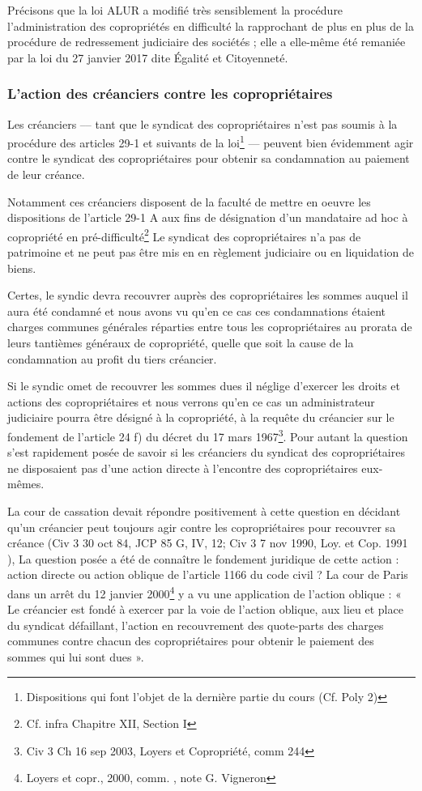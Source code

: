			Précisons que la loi ALUR a modifié très sensiblement la procédure l’administration des copropriétés en difficulté la rapprochant de plus en plus de la procédure de redressement judiciaire des sociétés ; elle a elle-même été remaniée par la loi du 27 janvier 2017 dite Égalité et Citoyenneté.
			
		\subsubsection{L’action des créanciers contre les copropriétaires}
		
			Les créanciers –-- tant que le syndicat des copropriétaires n’est pas soumis à la procédure des articles 29-1 et suivants de la loi\footnote{Dispositions qui font l’objet de la dernière partie du cours (Cf. Poly 2)} --- peuvent bien évidemment agir contre le syndicat des copropriétaires pour obtenir sa condamnation au paiement de leur créance.
			
			Notamment ces créanciers disposent de la faculté de mettre en oeuvre les dispositions de l’article 29-1 A aux fins de désignation d’un mandataire ad hoc à copropriété en pré-difficulté\footnote{Cf. infra Chapitre XII, Section I}
			Le syndicat des copropriétaires n’a pas de patrimoine et ne peut pas être mis en en règlement judiciaire ou en liquidation de biens.
			
			Certes, le syndic devra recouvrer auprès des copropriétaires les sommes auquel il aura été condamné et nous avons vu qu’en ce cas ces condamnations étaient charges communes générales réparties entre tous les copropriétaires au prorata de leurs tantièmes généraux de copropriété, quelle que soit la cause de la condamnation au profit du tiers créancier.
			
			Si le syndic omet de recouvrer les sommes dues il néglige d’exercer les droits et actions des copropriétaires et nous verrons qu’en ce cas un administrateur judiciaire pourra être désigné à la copropriété, à la requête du créancier sur le fondement de l’article 24 f) du décret du 17 mars 1967\footnote{Civ 3\degre{} Ch 16 sep 2003, Loyers et Copropriété, comm 244}. Pour autant la question s’est rapidement posée de savoir si les créanciers du syndicat des copropriétaires ne disposaient pas d’une action directe à l’encontre des copropriétaires eux-mêmes.
			
			La cour de cassation devait répondre positivement à cette question en décidant qu’un créancier peut toujours agir contre les copropriétaires pour recouvrer sa créance (Civ 3\degre{} 30 oct 84, JCP 85 G, IV, 12; Civ 3\degre{} 7 nov 1990, Loy. et Cop. 1991 ),
			La question posée a été de connaître le fondement juridique de cette action : action directe ou action oblique de l’article 1166 du code civil ?
			La cour de Paris dans un arrêt du 12 janvier 2000\footnote{Loyers et copr., 2000, comm. , note G. Vigneron} y a vu une application de l’action oblique : « Le créancier est fondé à exercer par la voie de l'action oblique, aux lieu et place du syndicat défaillant, l'action en recouvrement des quote-parts des charges communes contre chacun des copropriétaires pour obtenir le paiement des sommes qui lui sont dues ».
			
